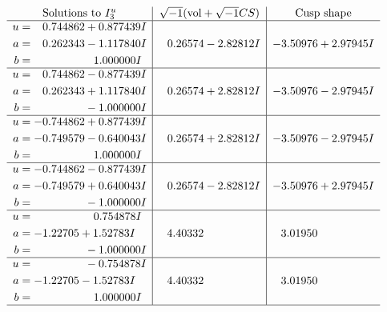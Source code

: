 \documentclass[1p]{elsarticle_modified}
\theoremstyle{definition}
\newcommand{\I}{\sqrt{-1}}
\begin{document}
$$\begin{array}{c|c|c}  
\text{Solutions to }I^u_{3}& \I (\text{vol} + \sqrt{-1}CS) & \text{Cusp shape}\\
 \hline 
\begin{aligned}
u &= \phantom{-}0.744862 + 0.877439 I \\
a &= \phantom{-}0.262343 - 1.117840 I \\
b &= \phantom{-0.000000 -}1.000000 I\end{aligned}
 & \phantom{-}0.26574 - 2.82812 I & -3.50976 + 2.97945 I \\ \hline\begin{aligned}
u &= \phantom{-}0.744862 - 0.877439 I \\
a &= \phantom{-}0.262343 + 1.117840 I \\
b &= \phantom{-0.000000 } -1.000000 I\end{aligned}
 & \phantom{-}0.26574 + 2.82812 I & -3.50976 - 2.97945 I \\ \hline\begin{aligned}
u &= -0.744862 + 0.877439 I \\
a &= -0.749579 - 0.640043 I \\
b &= \phantom{-0.000000 -}1.000000 I\end{aligned}
 & \phantom{-}0.26574 + 2.82812 I & -3.50976 - 2.97945 I \\ \hline\begin{aligned}
u &= -0.744862 - 0.877439 I \\
a &= -0.749579 + 0.640043 I \\
b &= \phantom{-0.000000 } -1.000000 I\end{aligned}
 & \phantom{-}0.26574 - 2.82812 I & -3.50976 + 2.97945 I \\ \hline\begin{aligned}
u &= \phantom{-0.000000 -}0.754878 I \\
a &= -1.22705 + 1.52783 I \\
b &= \phantom{-0.000000 } -1.000000 I\end{aligned}
 & \phantom{-}4.40332\phantom{ +0.000000I} & \phantom{-}3.01950\phantom{ +0.000000I} \\ \hline\begin{aligned}
u &= \phantom{-0.000000 } -0.754878 I \\
a &= -1.22705 - 1.52783 I \\
b &= \phantom{-0.000000 -}1.000000 I\end{aligned}
 & \phantom{-}4.40332\phantom{ +0.000000I} & \phantom{-}3.01950\phantom{ +0.000000I}\\
 \hline 
 \end{array}$$\newpage\newpage\renewcommand{\arraystretch}{1}
\end{document}
